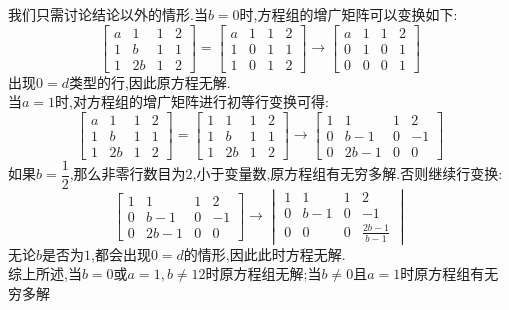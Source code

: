 \documentclass{ctexart}
\begin{document}
\begin{solution}
    我们只需讨论结论以外的情形.当$b=0$时,方程组的增广矩阵可以变换如下:
    \[\begin{bmatrix}
        a&1&1&2\\
        1&b&1&1\\
        1&2b&1&2
    \end{bmatrix}=\begin{bmatrix}
        a&1&1&2\\
        1&0&1&1\\
        1&0&1&2
    \end{bmatrix}\longrightarrow\begin{bmatrix}
        a&1&1&2\\
        0&1&0&1\\
        0&0&0&1
    \end{bmatrix}\]
    出现$0=d$类型的行,因此原方程无解.\\当$a=1$时,对方程组的增广矩阵进行初等行变换可得:
    \[\begin{bmatrix}
        a&1&1&2\\
        1&b&1&1\\
        1&2b&1&2
    \end{bmatrix}=\begin{bmatrix}
        1&1&1&2\\
        1&b&1&1\\
        1&2b&1&2
    \end{bmatrix}\longrightarrow\begin{bmatrix}
        1&1&1&2\\
        0&b-1&0&-1\\
        0&2b-1&0&0
    \end{bmatrix}\]
    如果$b=\dfrac12$,那么非零行数目为$2$,小于变量数,原方程组有无穷多解.否则继续行变换:
    \[\begin{bmatrix}
        1&1&1&2\\
        0&b-1&0&-1\\
        0&2b-1&0&0
    \end{bmatrix}\longrightarrow
    \begin{vmatrix}
        1&1&1&2\\
        0&b-1&0&-1\\
        0&0&0&\frac{2b-1}{b-1}
    \end{vmatrix}\]
    无论$b$是否为$1$,都会出现$0=d$的情形,因此此时方程无解.\\
    综上所述,当$b=0$或$a=1,b\neq12$时原方程组无解;当$b\neq0$且$a=1$时原方程组有无穷多解
\end{solution}
\end{document}
